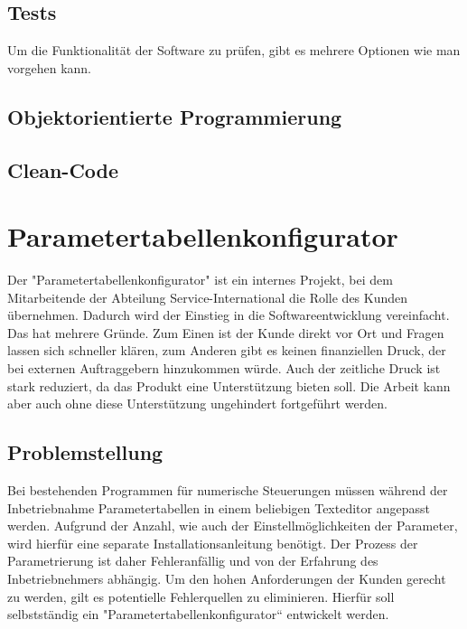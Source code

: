 \documentclass[a4paper,12pt,top=2.5cm,bottom=2.5cm, left=2.5cm, right=2.5cm, numbers=noenddot]{scrartcl}
\begin{document}
\subsection{Tests}
Um die Funktionalität der Software zu prüfen, gibt es mehrere Optionen wie man vorgehen kann.

\subsection{Objektorientierte Programmierung}
\label{Objektorientierte Programmierung}
\subsection{Clean-Code}
\label{Clean-Code}
\section{Parametertabellenkonfigurator}
Der "Parametertabellenkonfigurator" ist ein internes Projekt, bei dem Mitarbeitende der Abteilung Service-International die Rolle des Kunden übernehmen. Dadurch wird der Einstieg in die Softwareentwicklung vereinfacht. \\
Das hat mehrere Gründe. Zum Einen ist der Kunde direkt vor Ort und Fragen lassen sich schneller klären, zum Anderen gibt es keinen finanziellen Druck, der bei externen Auftraggebern hinzukommen würde. Auch der zeitliche Druck ist stark reduziert, da das Produkt eine Unterstützung bieten soll. Die Arbeit kann aber auch ohne diese Unterstützung ungehindert fortgeführt werden.
\subsection{Problemstellung}
Bei bestehenden Programmen für numerische Steuerungen müssen während der Inbetriebnahme Parametertabellen in einem beliebigen Texteditor angepasst werden. Aufgrund der Anzahl, wie auch der Einstellmöglichkeiten der Parameter, wird hierfür eine separate Installationsanleitung benötigt. Der Prozess der Parametrierung ist daher Fehleranfällig und von der Erfahrung des Inbetriebnehmers abhängig. Um den hohen Anforderungen der Kunden gerecht zu werden, gilt es potentielle Fehlerquellen zu eliminieren. Hierfür soll selbstständig ein "Parametertabellenkonfigurator“ entwickelt werden.
\end{document}
